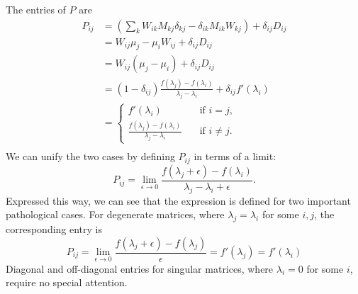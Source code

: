 \documentclass[../main.tex]{subfiles}
\begin{document}
\begin{refsection}
The entries of $P$ are
\begin{align*}
P_{ij}
  &= \left( \sum_k W_{ik} M_{kj} \delta_{kj} - \delta_{ik} M_{ik} W_{kj} \right) +
     \delta_{ij} D_{ij}\\
  &= W_{ij} \mu_j - \mu_i W_{ij} + \delta_{ij} D_{ij}\\
  &= W_{ij} (\mu_j - \mu_i) + \delta_{ij} D_{ij}\\
  &= (1 - \delta_{ij}) \frac{f(\lambda_j) - f(\lambda_i)}{\lambda_j - \lambda_i} +
     \delta_{ij} f'(\lambda_i)\\
  &= \begin{cases}
        f'(\lambda_i) \quad &\text{if } i = j,\\
        \frac{f(\lambda_j) - f(\lambda_i)}{\lambda_j - \lambda_i} \quad &\text{if } i \ne j.
     \end{cases}\\
\end{align*}
We can unify the two cases by defining $P_{ij}$ in terms of a limit:
\begin{equation*}
P_{ij} = \lim_{\epsilon \to 0}
         \frac{f(\lambda_j + \epsilon) - f(\lambda_i)}{\lambda_j - \lambda_i + \epsilon}.
\end{equation*}
Expressed this way, we can see that the expression is defined for two important pathological cases.
For degenerate matrices, where $\lambda_j = \lambda_i$ for some $i,j$, the corresponding entry is
\begin{equation*}
P_{ij} = \lim_{\epsilon \to 0}
         \frac{f(\lambda_j + \epsilon) - f(\lambda_j)}{\epsilon}
       = f'(\lambda_j) = f'(\lambda_i)
\end{equation*}
Diagonal and off-diagonal entries for singular matrices, where $\lambda_i=0$ for some $i$, require no special attention.


\end{refsection}
\end{document}
